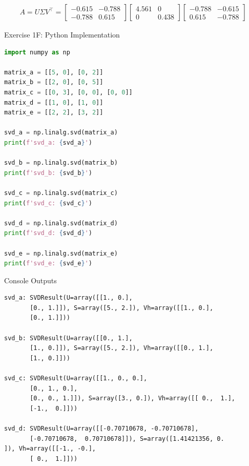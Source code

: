 \documentclass[11pt,letterpaper]{article}
\begin{document}
\begin{enumerate}
\begin{align*}
A = U \Sigma V^\top
= \begin{bmatrix}
        -0.615 & -0.788 \\
        -0.788 & 0.615
    \end{bmatrix}
    \begin{bmatrix}
        4.561 & 0 \\
        0 & 0.438
    \end{bmatrix}
    \begin{bmatrix}
        -0.788 & -0.615 \\
        0.615 & -0.788
    \end{bmatrix}
\end{align*}

\noindent\dotfill Exercise 1F: Python Implementation \noindent\dotfill

\begin{lstlisting}[language=Python]
import numpy as np

matrix_a = [[5, 0], [0, 2]]
matrix_b = [[2, 0], [0, 5]]
matrix_c = [[0, 3], [0, 0], [0, 0]]
matrix_d = [[1, 0], [1, 0]]
matrix_e = [[2, 2], [3, 2]]

svd_a = np.linalg.svd(matrix_a)
print(f'svd_a: {svd_a}')

svd_b = np.linalg.svd(matrix_b)
print(f'svd_b: {svd_b}')

svd_c = np.linalg.svd(matrix_c)
print(f'svd_c: {svd_c}')

svd_d = np.linalg.svd(matrix_d)
print(f'svd_d: {svd_d}')

svd_e = np.linalg.svd(matrix_e)
print(f'svd_e: {svd_e}')
\end{lstlisting}

\noindent\dotfill Console Outputs \noindent\dotfill

\begin{lstlisting}
svd_a: SVDResult(U=array([[1., 0.],
       [0., 1.]]), S=array([5., 2.]), Vh=array([[1., 0.],
       [0., 1.]]))

svd_b: SVDResult(U=array([[0., 1.],
       [1., 0.]]), S=array([5., 2.]), Vh=array([[0., 1.],
       [1., 0.]]))

svd_c: SVDResult(U=array([[1., 0., 0.],
       [0., 1., 0.],
       [0., 0., 1.]]), S=array([3., 0.]), Vh=array([[ 0.,  1.],
       [-1.,  0.]]))

svd_d: SVDResult(U=array([[-0.70710678, -0.70710678],
       [-0.70710678,  0.70710678]]), S=array([1.41421356, 0.        ]), Vh=array([[-1., -0.],
       [ 0.,  1.]]))


\end{lstlisting}
\end{enumerate}
\end{document}
